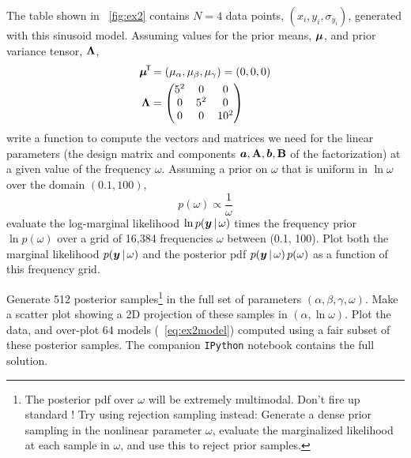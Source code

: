 The table shown in \figurename~\ref{fig:ex2} contains $N=4$ data points,
$(x_i, y_i, \sigma_{y_i})$, generated with this sinusoid model.
Assuming values for the prior means, $\boldsymbol{\mu}$, and prior variance tensor,
$\mathbf{\Lambda}$,
\begin{align}
  \boldsymbol{\mu}^{\!\mathsf{T}\!} &= (\mu_\alpha, \mu_\beta, \mu_\gamma) = (0, 0, 0)\\
  \mathbf{\Lambda} &=
    \begin{pmatrix}
      5^2 & 0 & 0\\
      0 & 5^2 & 0\\
      0 & 0 & 10^2
    \end{pmatrix}
\end{align}
write a function to compute the vectors and matrices we need for the linear
parameters (the design matrix and components
$\boldsymbol{a}, \mathbf{A}, \boldsymbol{b}, \mathbf{B}$
of the factorization) at a given value of the frequency $\omega$.
Assuming a prior on $\omega$ that is uniform in $\ln\omega$ over the domain
$(0.1, 100)$,
\begin{equation}
  p(\omega) \propto \frac{1}{\omega}
\end{equation}
evaluate the log-marginal likelihood $\ln p(\boldsymbol{y}\,|\,\omega)$ times the
frequency prior $\ln p(\omega)$ over a grid of 16,384 frequencies $\omega$
between (0.1, 100).
Plot both the marginal likelihood $p(\boldsymbol{y}\,|\,\omega)$ and the posterior pdf
$p(\boldsymbol{y}\,|\,\omega)\,p(\omega)$ as a function of this frequency grid.

Generate 512 posterior samples\footnote{The
posterior pdf over $\omega$ will be extremely multimodal. Don't fire up
standard ! Try using rejection sampling instead: Generate a
dense prior sampling in the nonlinear parameter $\omega$, evaluate
the marginalized likelihood at each sample in $\omega$, and use this
to reject prior samples.} in the full set of parameters
$(\alpha,\beta,\gamma,\omega)$.
Make a scatter plot showing a 2D projection of these samples in
$(\alpha, \ln \omega)$.
Plot the data, and over-plot 64 models (\equationname~\ref{eq:ex2model}) computed
using a fair subset of these posterior samples.
The companion \texttt{IPython} notebook contains the full solution.

\clearmargin\clearpage\raggedright



